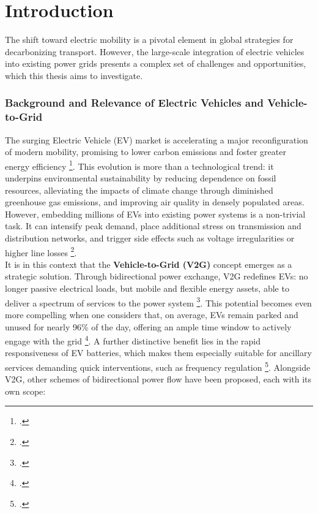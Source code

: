 \chapter{Introduction}
The shift toward electric mobility is a pivotal element in global strategies for decarbonizing transport. However, the large-scale integration of electric vehicles into existing power grids presents a complex set of challenges and opportunities, which this thesis aims to investigate.


\subsection{Background and Relevance of Electric Vehicles and Vehicle-to-Grid} %
The surging Electric Vehicle (EV) market is accelerating a major reconfiguration of modern mobility, promising to lower carbon emissions and foster greater energy efficiency \footcite{orfanoudakis2022deep}. 
This evolution is more than a technological trend: it underpins environmental sustainability by reducing dependence on fossil resources, alleviating the impacts of climate change through diminished greenhouse gas emissions, and improving air quality in densely populated areas. 
However, embedding millions of EVs into existing power systems is a non-trivial task. 
It can intensify peak demand, place additional stress on transmission and distribution networks, and trigger side effects such as voltage irregularities or higher line losses \footcite{orfanoudakis2022deep, salvatti2020electric}.
\\
\noindent
It is in this context that the \textbf{Vehicle-to-Grid (V2G)} concept emerges as a strategic solution. 
Through bidirectional power exchange, V2G redefines EVs: no longer passive electrical loads, but mobile and flexible energy assets, able to deliver a spectrum of services to the power system \footcite{alfaverh2022optima}. 
This potential becomes even more compelling when one considers that, on average, EVs remain parked and unused for nearly 96\% of the day, offering an ample time window to actively engage with the grid \footcite{evertsson2024investigating}. 
A further distinctive benefit lies in the rapid responsiveness of EV batteries, which makes them especially suitable for ancillary services demanding quick interventions, such as frequency regulation \footcite{alfaverh2022optima}. 
Alongside V2G, other schemes of bidirectional power flow have been proposed, each with its own scope: 
